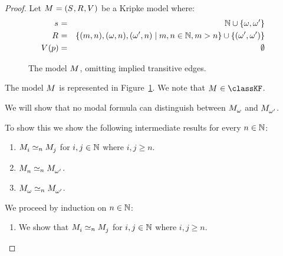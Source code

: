 \begin{proof}
Let $\kModelAndTuple$ be a Kripke model where:
\begin{eqnarray*}
\kStateS &=& \naturals \cup \{\omega, \omega'\}\\
\kAccessibility{} &=& \{(m, n), (\omega, n), (\omega', n) \mid m, n \in \naturals, m > n\} \cup \{(\omega', \omega')\}\\
\kValuation(\atomP) &=& \emptyset
\end{eqnarray*}

\begin{figure}
    \centering
    \caption{The model $\kModel$, omitting implied transitive edges.}\label{model-naturals}
\end{figure}

The model $\kModel$ is represented in Figure~\ref{model-naturals}.
We note that $\kModel \in \classKF$.

We will show that no modal formula can distinguish between $\kPModel{\omega}$ and $\kPModel{\omega'}$.

To show this we show the following intermediate results for every $n \in \mathbb{N}$:
\begin{enumerate}
    \item $\kPModel{i} \bisimilar[n] \kPModel{j}$ for $i, j \in \mathbb{N}$ where $i, j \geq n$.
    \item $\kPModel{n} \bisimilar[n] \kPModel{\omega'}$.
    \item $\kPModel{\omega} \bisimilar[n] \kPModel{\omega'}$.
\end{enumerate}

We proceed by induction on $n \in \mathbb{N}$:

\begin{enumerate}
    \item We show that $\kPModel{i} \bisimilar[n] \kPModel{j}$ for $i, j \in \mathbb{N}$ where $i, j \geq n$.


\end{enumerate}
\end{proof}

